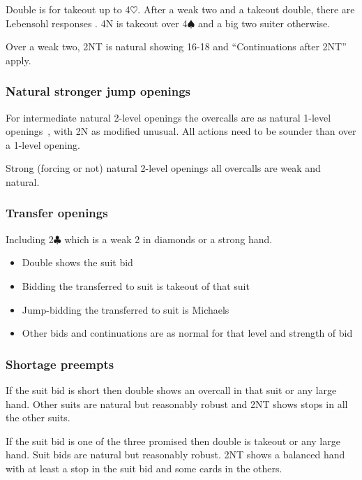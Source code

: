 \documentclass[a4paper,14pt]{extarticle}
\begin{document}
Double is for takeout up to 4$\heartsuit$. After a weak two and a takeout double, there
are Lebensohl responses . 4N is takeout over 4$\spadesuit$ and a big two suiter otherwise.

Over a weak two,  2NT is natural showing 16-18 and ``Continuations after 2NT'' 
apply.

\subsubsection{Natural stronger jump openings}
\label{sec:def:inter-strong}

For intermediate natural 2-level openings the overcalls are as natural 1-level
openings~, with 2N as modified unusual. All actions need to be
sounder than over a 1-level opening.

Strong (forcing or not) natural 2-level openings all overcalls are weak and natural.

\subsubsection{Transfer openings}
\label{sec:def:transfer}

Including 2$\clubsuit$ which is a weak 2 in diamonds or a strong hand.

\begin{itemize}
\item Double shows the suit bid
\item Bidding the transferred to suit is takeout of that suit
\item Jump-bidding the transferred to suit is Michaels
\item Other bids and continuations are as normal for that level and strength of bid
\end{itemize}

\subsubsection{Shortage preempts}

If the suit bid is short then double shows an overcall in that suit or any
large hand.  Other suits are natural but reasonably robust and 2NT shows stops
in all the other suits.

If the suit bid is one of the three promised then double is takeout or any large hand.
Suit bids are natural but reasonably robust. 2NT shows a balanced hand with at 
least a stop in the suit bid and some cards in the others.
\end{document}
